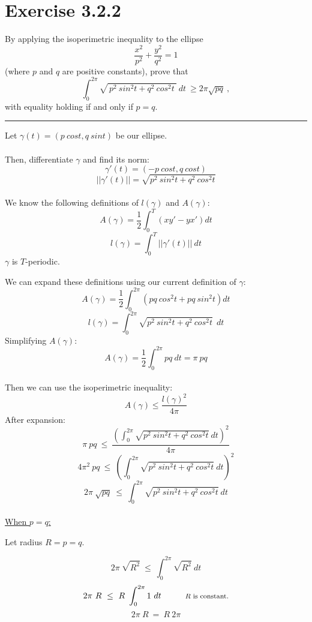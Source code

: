 \documentclass[12pt]{article}
\begin{document}
\maketitle

\section*{Exercise 3.2.2}

By applying the isoperimetric inequality to the ellipse
$$
\frac{x^2}{p^2}+\frac{y^2}{q^2} = 1
$$
(where $p$ and $q$ are positive constants), prove that
$$
\int_{0}^{2\pi}\sqrt{ \, p^2 \ sin^2t + q^2 \ cos^2t \ } \ dt \ \geq 2\pi \sqrt{pq} \ ,
$$
with equality holding if and only if $p = q$.

\vspace{1cm}
\hrule
\vspace{1cm}

\noindent
Let $\gamma(t) = (p \ cost, q \ sint)$ be our ellipse.\\\\
Then, differentiate $\gamma$ and find its norm:
$$
\gamma'(t) = (-p \ cost, q \ cost)
$$
$$
||\gamma'(t)|| = \sqrt{p^2 \ sin^2t + q^2 \ cos^2t}
$$
\\
We know the following definitions of $l(\gamma)$ and $A(\gamma)$:
$$
A(\gamma) = \frac{1}{2}\int_{0}^{T} \left( xy' - yx' \right) dt
$$
$$
l(\gamma) = \int_{0}^{T}||\gamma'(t)||  \ dt
$$
$\gamma$ is $T$-periodic.

\clearpage
We can expand these definitions using our current definition of $\gamma$:
$$
A(\gamma) = \frac{1}{2}\int_{0}^{2\pi} \left( pq \ cos^2t + pq \ sin^2t \right) dt
$$
$$
l(\gamma) = \int_{0}^{2\pi}\sqrt{p^2 \ sin^2t + q^2 \ cos^2t}  \ \ dt
$$
Simplifying $A(\gamma)$:
$$
A(\gamma) = \frac{1}{2}\int_{0}^{2\pi} pq \ dt = \pi \ pq
$$
\\
Then we can use the isoperimetric inequality:
$$
A(\gamma) \leq \frac{l(\gamma)^2}{4\pi}
$$
After expansion:
$$
\pi \ pq  \ \leq \ \frac{ \left( \int_{0}^{2\pi}\sqrt{p^2 \ sin^2t + q^2 \ cos^2t} \ dt \right)^2 }{4\pi}
$$
$$
4\pi^2 \ pq  \ \leq \  \left( \int_{0}^{2\pi}\sqrt{p^2 \ sin^2t + q^2 \ cos^2t} \ dt \right)^2
$$
$$
2\pi \ \sqrt{pq}  \ \leq \ \int_{0}^{2\pi}\sqrt{p^2 \ sin^2t + q^2 \ cos^2t} \ dt
$$
\\
\noindent
\underline{When $p=q$:}\\
\indent

Let radius $R = p = q$.

$$
2\pi \ \sqrt{R^2}  \ \leq \ \int_{0}^{2\pi}\sqrt{R^2} \ dt
$$
$$
2\pi \ R  \ \leq \ R \ \int_{0}^{2\pi}1 \ dt \hspace{1cm}\textrm{{\footnotesize $R$ is constant.}}
$$
$$
2\pi \ R  \ = \ R \ 2\pi
$$
\end{document}
